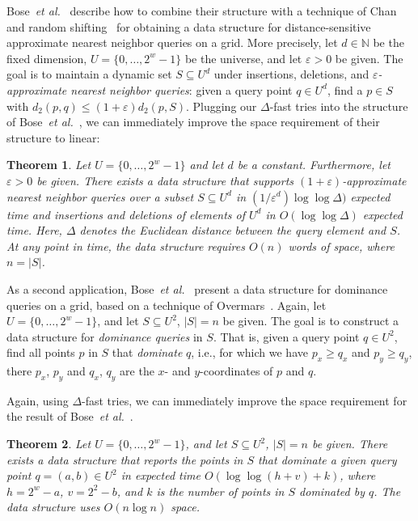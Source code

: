 \documentclass[a4paper,11pt]{article}
\newtheorem{theorem}{Theorem}[section]
\newcommand{\eps}{\varepsilon}
\newcommand{\N}{\mathbb{N}}
\newcommand{\etal}{\emph{et al.}\xspace}
\newcommand{\?}{\mskip1.5mu}
\begin{document}
Bose~\etal~\cite{BoseDoDuHoMo13} describe how to combine their structure
with a technique of Chan~\cite{Chan02} and random 
shifting~\cite[Chapter~11]{HarPeled11} for obtaining a data structure for 
distance-sensitive
approximate nearest neighbor queries on a grid.
More precisely, let $d \in \N$ be the fixed dimension, 
$U = \{0, \dots, 2^{w}-1\}$ be the universe, and
let $\eps > 0$ be given.
The goal is to maintain a dynamic set $S \subseteq U^d$ under
insertions, deletions, and \emph{$\eps$-approximate
nearest neighbor queries}: given a query point $q \in U^d$,
find a $p \in S$ with $d_2(p,q) \leq (1+\eps)d_2(p, S)$.
Plugging our $\Delta$-fast tries into the structure of
Bose~\etal~\cite[Theorem~9]{BoseDoDuHoMo13}, we can
immediately improve the space requirement of their structure to linear:
\begin{theorem}
Let $U = \{0, \dots, 2^w-1\}$ and let $d$ be a constant.
Furthermore, let $\eps > 0$ be given.
There exists a data structure that supports $(1+\eps)$-approximate
nearest neighbor queries over a subset $S \subseteq U^d$ in 
$(1/\eps^d)\log\log \Delta)$ expected time and insertions and deletions
of elements of $U^d$ in $O(\log\log \Delta)$ expected time.
Here, $\Delta$ denotes the Euclidean distance between the query element
and $S$. At any point in time, the data structure requires $O(n)$
words of space, where $n  = |S|$.
\end{theorem}

As a second application, Bose~\etal~\cite{BoseDoDuHoMo13}
present a data structure for dominance queries on a grid,
based on a technique of Overmars~\cite{Overmars88}.
Again, let $U = \{0, \dots, 2^w-1\}$, and let $S \subseteq U^2$,
$|S| = n$ be given. The goal is to construct a data structure
for \emph{dominance queries} in $S$. That is, given a query point
$q \in U^2$, find all points $p$ in $S$ that \emph{dominate} $q$,
i.e., for which we have $p_x \geq q_x$ and $p_y \geq q_y$, there
$p_x$, $p_y$ and $q_x$, $q_y$ are the $x$- and $y$-coordinates 
of $p$ and $q$.

Again, using $\Delta$-fast tries, we can immediately improve the
space requirement for the result of 
Bose~\etal~\cite[Theorem~10, Corollary~13]{BoseDoDuHoMo13}.

\begin{theorem}
Let $U = \{0, \dots, 2^w-1\}$, and let $S \subseteq U^2$, $|S|=n$
be given. There exists a data structure that reports the points in $S$
that dominate a given query point $q = (a,b) \in U^2$ in expected time
$O(\log\log(h+v) + k)$, where $h = 2^w - a$, $v = 2^2-b$, and $k$
is the number of points in $S$ dominated by $q$.
The data structure uses $O(n \log n)$ space.
\end{theorem}
\end{document}

